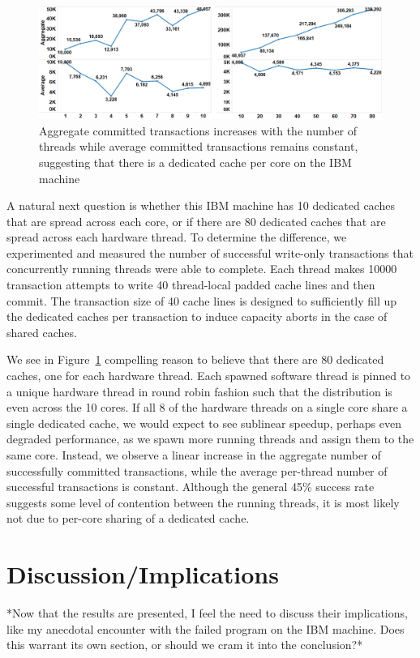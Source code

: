 \documentclass{article}
\begin{document}
\begin{figure}[]%
\centering
{}
\includegraphics[width=\linewidth]{images/wttm_core_or_thread_ibm}
\caption{Aggregate committed transactions increases with the number of threads
while average committed transactions remains constant, suggesting that there is
a dedicated cache per core on the IBM machine}
\label{fig:wttm_core_or_thread_ibm}
\end{figure}

A natural next question is whether this IBM machine has 10 dedicated caches that
are spread across each core, or if there are 80 dedicated caches that are spread
across each hardware thread. To determine the difference, we experimented and
measured the number of successful write-only transactions that concurrently
running threads were able to complete. Each thread makes 10000 transaction
attempts to write 40 thread-local padded cache lines and then commit. The
transaction size of 40 cache lines is designed to sufficiently fill up the
dedicated caches per transaction to induce capacity aborts in the case of shared
caches.

We see in Figure~\ref{fig:wttm_core_or_thread_ibm} compelling reason to believe that
there are 80 dedicated caches, one for each hardware thread. Each spawned
software thread is pinned to a unique hardware thread in round robin fashion
such that the distribution is even across the 10 cores. If all 8 of the
hardware threads on a single core share a single dedicated cache, we would
expect to see sublinear speedup, perhaps even degraded performance, as we spawn
more running threads and assign them to the same core. Instead, we observe a
linear increase in the aggregate number of successfully committed transactions,
while the average per-thread number of successful transactions is constant.
Although the general 45\% success rate suggests some level of contention between
the running threads, it is most likely not due to per-core sharing of a
dedicated cache.

\section{Discussion/Implications}
*Now that the results are presented, I feel the need to discuss their
implications, like my anecdotal encounter with the failed program on the IBM
machine. Does this warrant its own section, or should we cram it into the
conclusion?*
\end{document}

